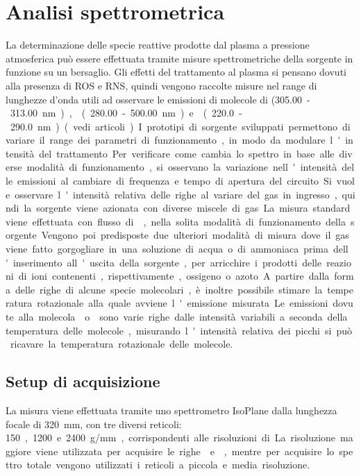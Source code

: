 \chapter{Analisi spettrometrica}
\label{ch:spettro}

La determinazione delle specie reattive prodotte dal plasma a pressione atmosferica può essere effettuata tramite misure spettrometriche della sorgente in funzione su un bersaglio.
Gli effetti del trattamento al plasma si pensano dovuti alla presenza di ROS e RNS, quindi vengono raccolte misure nel range di lunghezze d'onda utili ad osservare le emissioni di molecole di  (\SI{305.00}-\SI{313.00}{\nano\meter}),  (\SI{280.00}-\SI{500.00}{\nano\meter}) e  (\SI{220.0}-\SI{290.0}{\nano\meter}) (vedi articoli).

I prototipi di sorgente sviluppati permettono di variare il range dei parametri di funzionamento, in modo da modulare l'intensità del trattamento. Per verificare come cambia lo spettro in base alle diverse modalità di funzionamento, si osservano la variazione nell'intensità delle emissioni al cambiare di frequenza e tempo di apertura del circuito.

Si vuole osservare l'intensità relativa delle righe al variare del gas in ingresso, quindi la sorgente viene azionata con diverse miscele di gas. La misura standard viene effettuata con flusso di , nella solita modalità di funzionamento della sorgente. Vengono poi predisposte due ulteriori modalità di misura dove il gas viene fatto gorgogliare in una soluzione di acqua o di ammoniaca prima dell'inserimento all'uscita della sorgente, per arricchire i prodotti delle reazioni di ioni contenenti, rispettivamente, ossigeno o azoto.

A partire dalla forma delle righe di alcune specie molecolari, è inoltre possibile stimare la temperatura rotazionale alla quale avviene l'emissione misurata. Le emissioni dovute alla molecola  o  sono varie righe dalle intensità variabili a seconda della temperatura delle molecole, misurando l'intensità relativa dei picchi si può ricavare la temperatura rotazionale delle molecole.

\section{Setup di acquisizione}
La misura viene effettuata tramite uno spettrometro IsoPlane dalla lunghezza focale di \SI{320}{\milli\meter}, con tre diversi reticoli: \SI{150}, \SI{1200} e \SI{2400}{g/\milli\meter}, corrispondenti alle risoluzioni di ... .
La risoluzione maggiore viene utilizzata per acquisire le righe  e , mentre per acquisire lo spettro totale vengono utilizzati i reticoli a piccola e media risoluzione.

